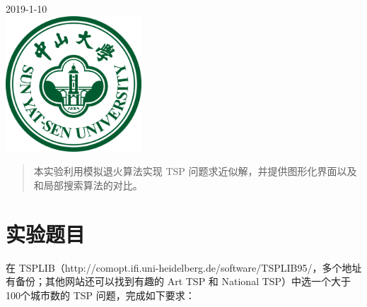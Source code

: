 \begin{titlepage}


{\large 2019-1-10}\\[1cm] %


\includegraphics[width=2in]{logo.png}\\[0.5cm] %
 

\vfill %

\end{titlepage}


\begin{abstract}
    
本实验利用模拟退火算法实现 TSP 问题求近似解，并提供图形化界面以及和局部搜索算法的对比。

\end{abstract}

\section{实验题目}

在 TSPLIB（http://comopt.ifi.uni-heidelberg.de/software/TSPLIB95/，多个地址有备份；其他网站还可以找到有趣的 Art TSP 和 National TSP）中选一个大于100个城市数的 TSP 问题，完成如下要求：

